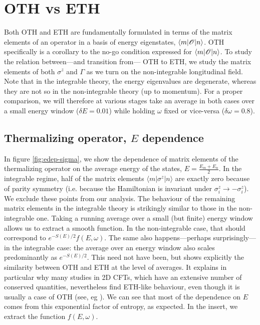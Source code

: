 \section{OTH vs ETH}
Both OTH and ETH are fundamentally formulated in terms of the matrix elements of an operator in a basis of energy eigenstates, $\langle m|\mathcal{O}|n\rangle$. OTH specifically is a corollary to the no-go condition expressed for $\langle m|\mathcal{O}|n\rangle$. To study the relation between---and transition from--- OTH to ETH, we study the matrix elements of both $\sigma^z$ and $\Gamma$ as we turn on the non-integrable longitudinal field. Note that in the integrable theory, the energy eigenvalues are degenerate, whereas they are not so in the non-integrable theory (up to momentum). For a proper comparison, we will therefore at various stages take an average in both cases over a small energy window ($\delta E=0.01$) while holding $\omega$ fixed or vice-versa ($\delta \omega=0.8$).
\subsection{Thermalizing operator, $E$ dependence}
In figure \ref{fig:edep-sigma}, we show the dependence of matrix elements of the thermalizing operator on the average energy of the states, $E=\frac{E_m+E_n}{2}$. In the integrable regime, half of the matrix elements $\langle m|\sigma^z|n\rangle$ are exactly zero because of parity symmetry (i.e. because the Hamiltonian is invariant under $\sigma_i^z \rightarrow -\sigma_i^z$). We exclude these points from our analysis. The behaviour of the remaining matrix elements in the integrable theory is strikingly similar to those in the non-integrable one. Taking a running average over a small (but finite) energy window allows us to extract a smooth function. In the non-integrable case, that should correspond to $e^{-S(E)/2} f(E,\omega)$. The same also happens---perhaps surprisingly--- in the integrable case: the average over an energy window also scales predominantly as $e^{-S(E)/2}$. This need not have been, but shows explicitly the similarity between OTH and ETH at the level of averages. It explains in particular why many studies in 2D CFTs, which have an extensive number of conserved quantities, nevertheless find ETH-like behaviour, even though it is usually a case of OTH (see, eg \cite{Brehm:2018ipf,Romero-Bermudez:2018dim,Hikida:2018khg,besken2019quantum}). We can see that most of the dependence on $E$ comes from this exponential factor of entropy, as expected. In the insert, we extract the function $f(E,\omega)$. 

